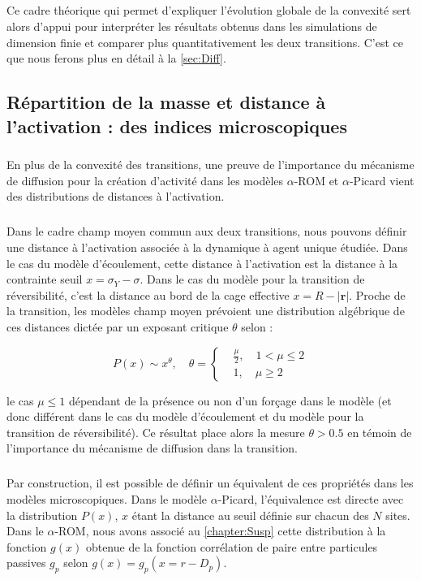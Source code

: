 \subparagraph{}Ce cadre théorique qui permet d'expliquer l'évolution globale de la convexité sert alors d'appui pour interpréter les résultats obtenus dans les simulations de dimension finie et comparer plus quantitativement les deux transitions. C'est ce que nous ferons plus en détail à la \autoref{sec:Diff}.

\subsection[Répartition de la masse et distance à l'activation :\\ des indices microscopiques]{Répartition de la masse et distance à l'activation : des indices microscopiques}

\subparagraph{}En plus de la convexité des transitions, une preuve de l'importance du mécanisme de diffusion pour la création d'activité dans les modèles $\alpha$-ROM et $\alpha$-Picard vient des distributions de distances à l'activation.

\subparagraph{}Dans le cadre champ moyen commun aux deux transitions, nous pouvons définir une distance à l'activation associée à la dynamique à agent unique étudiée. Dans le cas du modèle d'écoulement, cette distance à l'activation est la distance à la contrainte seuil $x = \sigma_Y - \sigma$. Dans le cas du modèle pour la transition de réversibilité, c'est la distance au bord de la cage effective $x = R-|\mathbf{r}|$. Proche de la transition, les modèles champ moyen prévoient une distribution algébrique de ces distances dictée par un exposant critique $\theta$ selon :

\begin{equation}
	P(x) \sim x^\theta, \quad \theta = \left\{
	\begin{aligned}
	&\frac{\mu}{2}, \quad 1 < \mu \leq 2\\
	&1, \quad \mu \geq 2
	\end{aligned}
	\right.
\end{equation}

\noindent le cas $\mu \leq 1$ dépendant de la présence ou non d'un forçage dans le modèle \cite{lin_mean_field_2016} (et donc différent dans le cas du modèle d'écoulement et du modèle pour la transition de réversibilité). Ce résultat place alors la mesure $\theta > 0.5$ en témoin de l'importance du mécanisme de diffusion dans la transition.

\subparagraph{}Par construction, il est possible de définir un équivalent de ces propriétés dans les modèles microscopiques. Dans le modèle $\alpha$-Picard, l'équivalence est directe avec la distribution $P(x)$, $x$ étant la distance au seuil définie sur chacun des $N$ sites. Dans le $\alpha$-ROM, nous avons associé au \autoref{chapter:Susp} cette distribution à la fonction $g(x)$ obtenue de la fonction corrélation de paire entre particules passives $g_p$ selon $g(x) = g_p(x = r - D_p)$.

